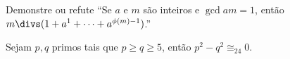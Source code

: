 \begin{exercise}
    Demonstre ou refute ``Se $a$ e $m$ s\~ao inteiros e $\gcd a m = 1$, ent\~ao
    $m \divs (1 + a^1 + \dots + a^{\phi(m)-1})$.''
\end{exercise}

\begin{exercise}
    Sejam $p, q$ primos tais que $p \ge q \ge 5$, ent\~ao $p^2-q^2 \cong_{24}
    0$.
\end{exercise}
